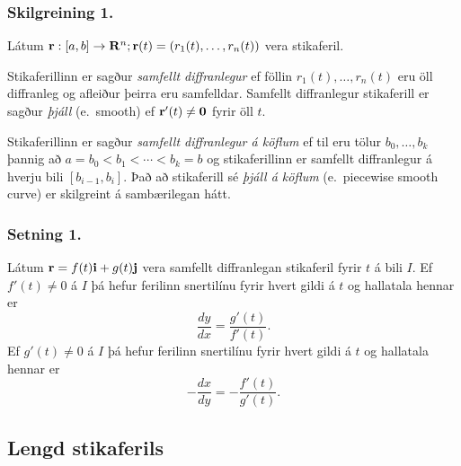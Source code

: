 \subsubsection{Skilgreining 1.}
Látum $\mbox{${\bf r}$}:  [a,b]\rightarrow \mbox{${\bf R}^n$}; \mbox{${\bf r}$}(t)=(r_1(t),\ldots,r_n(t))$ vera stikaferil.  

Stikaferillinn er sagður {\em samfellt diffranlegur} ef föllin
$r_1(t),\ldots,r_n(t)$ eru öll diffranleg og afleiður þeirra eru
samfelldar.  Samfellt diffranlegur stikaferill er sagður {\em þjáll}
(e.~smooth) ef $\mbox{${\bf r}$}'(t)\neq\mbox{${\bf 0}$}$ fyrir öll $t$. 

\medskip
Stikaferillinn er sagður {\em samfellt diffranlegur á köflum} ef til eru
tölur $b_0,\ldots,b_k$ þannig að  $a=b_0<b_1<\cdots<b_k=b$ og
stikaferillinn er samfellt diffranlegur á hverju bili $[b_{i-1}, b_i]$.
Það að stikaferill sé {\em þjáll á köflum}  
(e.~piecewise smooth curve) er
skilgreint á sambærilegan hátt. 


 \subsubsection{Setning 1.}
Látum $\mbox{${\bf r}$}=f(t)\mbox{${\bf i}$}+g(t)\mbox{${\bf j}$}$ vera samfellt diffranlegan stikaferil fyrir $t$ á bili $I$. Ef $f'(t) \neq 0$ á $I$ þá hefur ferilinn snertilínu fyrir hvert gildi á $t$ og hallatala hennar er 
\begin {equation*}
 \frac{dy}{dx} = \frac{g'(t)}{f'(t)}.
\end {equation*}
Ef $g'(t) \neq 0$ á $I$ þá hefur ferilinn snertilínu fyrir hvert gildi á $t$ og hallatala hennar er
\begin {equation*}
 -\frac{dx}{dy} = -\frac{f'(t)}{g'(t)}.
\end {equation*}

% 
 



\subsection{Lengd stikaferils}
